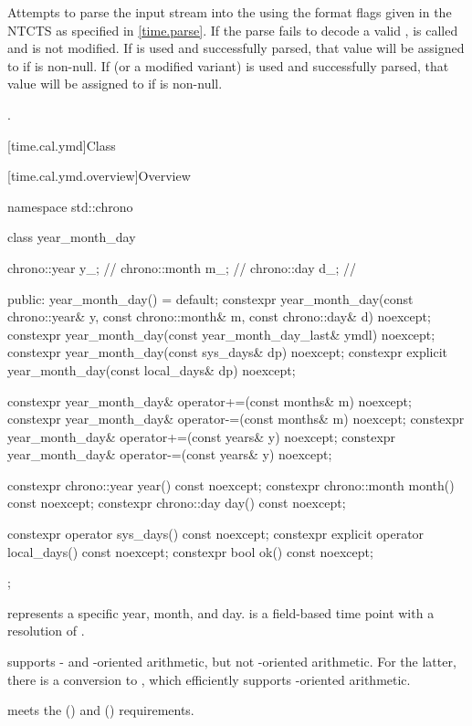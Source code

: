 \begin{itemdescr}
\pnum
\effects
Attempts to parse the input stream 
into the   using
the format flags given in the NTCTS 
as specified in \ref{time.parse}.
If the parse fails to decode a valid ,
 is called and
 is not modified.
If  is used and successfully parsed,
that value will be assigned to  if  is non-null.
If  (or a modified variant) is used and successfully parsed,
that value will be assigned to  if  is non-null.

\pnum
\returns
{}.
\end{itemdescr}

[time.cal.ymd]{Class }

[time.cal.ymd.overview]{Overview}

\begin{codeblock}
namespace std::chrono {
  class year_month_day {
    chrono::year  y_;           // \expos
    chrono::month m_;           // \expos
    chrono::day   d_;           // \expos

  public:
    year_month_day() = default;
    constexpr year_month_day(const chrono::year& y, const chrono::month& m,
                             const chrono::day& d) noexcept;
    constexpr year_month_day(const year_month_day_last& ymdl) noexcept;
    constexpr year_month_day(const sys_days& dp) noexcept;
    constexpr explicit year_month_day(const local_days& dp) noexcept;

    constexpr year_month_day& operator+=(const months& m) noexcept;
    constexpr year_month_day& operator-=(const months& m) noexcept;
    constexpr year_month_day& operator+=(const years& y)  noexcept;
    constexpr year_month_day& operator-=(const years& y)  noexcept;

    constexpr chrono::year  year()  const noexcept;
    constexpr chrono::month month() const noexcept;
    constexpr chrono::day   day()   const noexcept;

    constexpr          operator sys_days()   const noexcept;
    constexpr explicit operator local_days() const noexcept;
    constexpr bool ok() const noexcept;
  };
}
\end{codeblock}

\pnum
{} represents a specific year, month, and day.
 is a field-based time point with a resolution of .
\begin{note}
 supports - and -oriented arithmetic,
but not -oriented arithmetic.
For the latter, there is a conversion to ,
which efficiently supports -oriented arithmetic.
\end{note}
 meets the  ()
and  () requirements.

